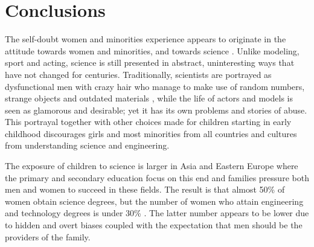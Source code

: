 \documentclass[utf8]{frontiersSCNS} %
\begin{document}
 

\section{Conclusions}
The self-doubt women and minorities experience appears to originate in the attitude towards women and minorities, and towards science \citep{else2013math,organisation2015abc}. Unlike modeling, sport and acting, science is still presented in abstract, uninteresting ways that have not changed for centuries.  Traditionally, scientists are portrayed as dysfunctional men with crazy hair who manage to make use of random numbers, strange objects and outdated materials \citep{fralick2009middle}, while the life of actors and models is seen as glamorous and desirable; yet it has its own problems and stories of abuse.   This portrayal together with other choices made for children starting in early childhood discourages girls and most minorities from all countries and cultures from understanding science and engineering.

The exposure of children to science is larger in Asia and Eastern Europe where the primary and secondary education focus on this end and families pressure both men and women to succeed in these fields. The result is that almost 50\% of women obtain science degrees, but the number of women who attain engineering and technology degrees is under 30\% \citep{India2017,Eurostat,SheNumbers}. The latter number appears to be lower due to hidden and overt biases coupled with the expectation that men should be the providers of the family.
\end{document}
